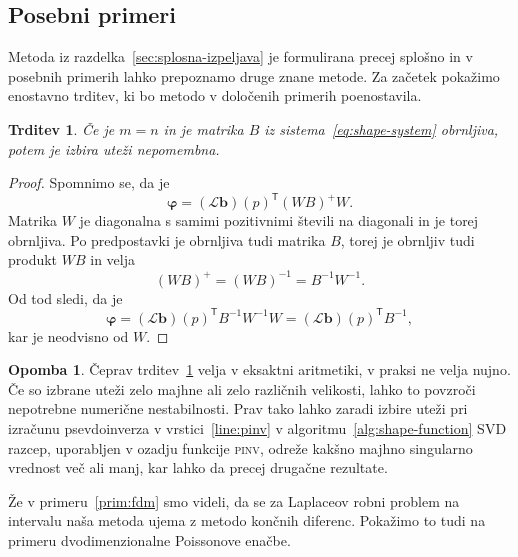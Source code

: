 \documentclass[12pt,a4paper,twoside]{article}
\theoremstyle{definition} %
\newtheorem{opomba}[definicija]{Opomba}
\theoremstyle{plain} %
\newtheorem{trditev}[definicija]{Trditev}
\numberwithin{equation}{section}
\renewcommand{\L}{\mathcal{L}}
\newcommand{\T}{\mathsf{T}}
\renewcommand{\b}{\boldsymbol}
\renewcommand{\phi}{\varphi}
\begin{document}
\subsection{Posebni primeri}
\label{sec:posebni-primeri}
Metoda iz razdelka~\ref{sec:splosna-izpeljava} je formulirana precej splošno in
v posebnih primerih lahko prepoznamo druge znane metode. Za začetek pokažimo
enostavno trditev, ki bo metodo v določenih primerih poenostavila.
\begin{trditev}
  \label{trd:weight-independence}
  Če je $m = n$ in je matrika $B$ iz sistema~\eqref{eq:shape-system} obrnljiva,
  potem je izbira uteži nepomembna.
\end{trditev}
\begin{proof}
Spomnimo se, da je \[
  \b\phi = (\L\b{b})(p)^\T(WB)^{+}W.
\]
Matrika $W$ je diagonalna s samimi pozitivnimi števili na diagonali in je torej
obrnljiva. Po predpostavki je obrnljiva tudi matrika $B$, torej je obrnljiv tudi
produkt $WB$ in velja
\[
  (WB)^+ = (WB)^{-1} = B^{-1}W^{-1}.
\]
Od tod sledi, da je
\[
  \b\phi = (\L\b{b})(p)^\T B^{-1} W^{-1} W = (\L\b{b})(p)^\T B^{-1},
\]
kar je neodvisno od $W$.
\end{proof}
\begin{opomba}
  Čeprav trditev~\ref{trd:weight-independence} velja v eksaktni aritmetiki, v
  praksi ne velja nujno. Če so izbrane uteži zelo majhne ali zelo različnih
  velikosti, lahko to povzroči nepotrebne numerične nestabilnosti. Prav tako
  lahko zaradi izbire uteži pri izračunu psevdoinverza v vrstici~\ref{line:pinv}
  v algoritmu~\ref{alg:shape-function} SVD razcep, uporabljen v ozadju
  funkcije \textsc{pinv}, odreže kakšno majhno singularno vrednost več ali manj,
  kar lahko da precej drugačne rezultate.
\end{opomba}

Že v primeru~\ref{prim:fdm} smo videli, da se za Laplaceov robni problem na
intervalu naša metoda ujema z metodo končnih diferenc. Pokažimo to tudi na
primeru dvodimenzionalne Poissonove enačbe.
\end{document}
